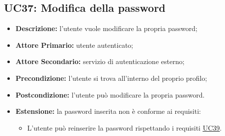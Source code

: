 \subsection{UC37: Modifica della password}
\label{sec:UC37}
\begin{itemize}
    \item \textbf{Descrizione:} l'utente vuole modificare la propria password;
    \item \textbf{Attore Primario:} utente autenticato;
    \item \textbf{Attore Secondario:} servizio di autenticazione esterno;
    \item \textbf{Precondizione:} l'utente si trova all'interno del proprio profilo;
    \item \textbf{Postcondizione:} l'utente può modificare la propria password.
    \item \textbf{Estensione:} la password inserita non è conforme ai requisiti:
          \begin{itemize}
              \item L'utente può reinserire la password rispettando i requisiti \underline{\hyperref[sec:UC39]{UC39}}.
          \end{itemize}
\end{itemize}